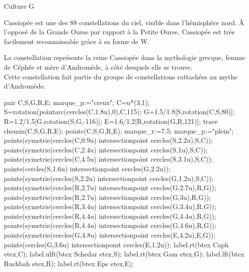 \begin{exercice*}
    \begin{changemargin}{-10mm}{-10mm}
        \begin{myBoxText}{ Culture G}
            \begin{flushleft}
                Cassiopée est une des 88 constellations du ciel, visible dans
                l'hémisphère nord. À l'opposé de la Grande Ourse par rapport à la 
                Petite Ourse, Cassiopée est très facilement reconnaissable grâce à 
                sa forme de \og W\fg.\par
                La constellation représente la reine Cassiopée dans la mythologie
                grecque, femme de Céphée et mère d'Andromède, à côté desquels elle se
                trouve.\\
                Cette constellation fait partie du groupe de constellations rattachées au mythe d'Andromède.
            \end{flushleft}
            {\tiny {}}
        \end{myBoxText}    

        \begin{Geometrie}
            pair C,S,G,R,E;
            marque_p:="creux";
            C=u*(3,1);
            S=rotation(pointarc(cercles(C,1.8u),0),C,115);
            G=1.5/1.8[S,rotation(C,S,80)];
            R=1.2/1.5[G,rotation(S,G,-116)];
            E=1.6/1.2[R,rotation(G,R,121)];
            trace chemin(C,S,G,R,E);
            pointe(C,S,G,R,E);
            marque_r:=7.5;
            marque_p:="plein";
            pointe(symetrie(cercles(C,0.9u) intersectionpoint cercles(S,2.2u),S,C));
            pointe(symetrie(cercles(C,2.4u) intersectionpoint cercles(S,1u),S,C));
            pointe(symetrie(cercles(C,4.5u) intersectionpoint cercles(S,3.1u),S,C));
            pointe(cercles(S,1.6u) intersectionpoint cercles(G,2.2u));
            pointe(symetrie(cercles(S,2.2u) intersectionpoint cercles(G,1.2u),S,C));
            pointe(symetrie(cercles(R,2.7u) intersectionpoint cercles(G,2.7u),R,G));
            pointe(symetrie(cercles(R,2.7u) intersectionpoint cercles(G,3u),R,G));
            pointe(symetrie(cercles(R,3.4u) intersectionpoint cercles(G,3.4u),R,G));
            pointe(symetrie(cercles(R,4.4u) intersectionpoint cercles(G,4.4u),R,G));
            pointe(symetrie(cercles(R,4.4u) intersectionpoint cercles(G,4.6u),R,G));
            pointe(symetrie(cercles(G,4.8u) intersectionpoint cercles(E,4.2u),E,G));
            pointe(cercles(G,3.6u) intersectionpoint cercles(E,1.2u));
            label.rt(btex Caph etex,C);
            label.ulft(btex Schedar etex,S);
            label.rt(btex Gam etex,G);
            label.lft(btex Ruchbah etex,R);
            label.rt(btex Eps etex,E);
        \end{Geometrie}
    \end{changemargin}


\end{exercice*}

